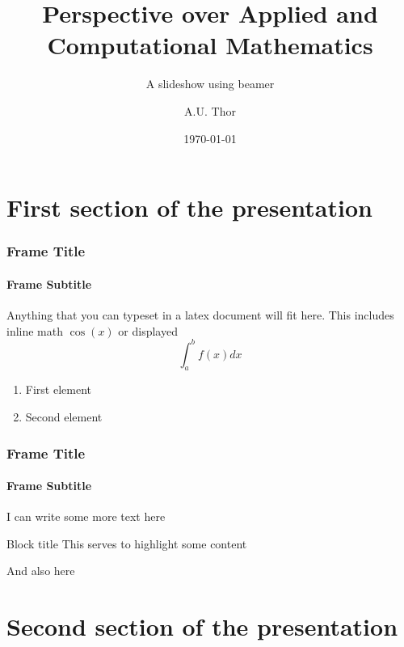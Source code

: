\documentclass{beamer}
\begin{document}
\title[Perspective A. \& C. Mathematics]{Perspective over Applied and Computational Mathematics}
\subtitle{A slideshow using beamer}
\author{A.U. Thor}
\date{\today}

\maketitle %

\section{First section of the presentation}

\frame{\tableofcontents} %



\begin{frame}
  \frametitle{Frame Title}
  \framesubtitle{Frame Subtitle}
  
  Anything that you can typeset in a latex document will fit here. This includes inline math $\cos(x)$ or displayed $$\int_a^b f(x) dx$$
  \begin{enumerate}
    \item First element
    \item Second element
  \end{enumerate}
  
  
\end{frame}

\begin{frame}
  \frametitle{Frame Title}
  \framesubtitle{Frame Subtitle}
  

  I can write some more text here 

  \begin{block}{Block title}
    This serves to \alert{highlight} some content
  \end{block}
  
  And also here


\end{frame}



\section{Second section of the presentation}

\frame{\tableofcontents[currentsection]} %
\end{document}
